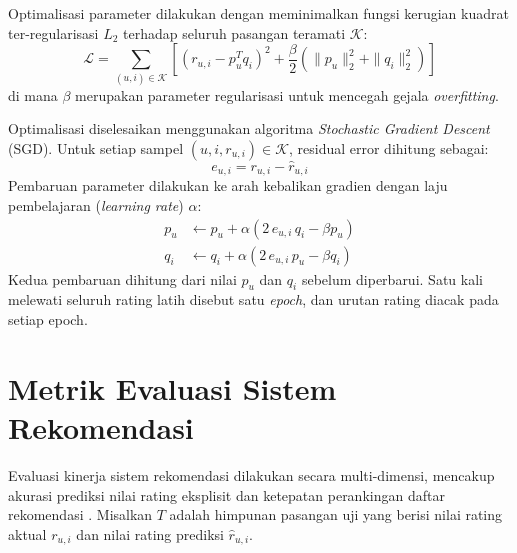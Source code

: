 Optimalisasi parameter dilakukan dengan meminimalkan fungsi kerugian kuadrat ter-regularisasi $L_2$ terhadap seluruh pasangan teramati $\mathcal{K}$:
\begin{equation}
\label{eq:mf_loss}
\mathcal{L} = \sum_{(u, i) \in \mathcal{K}} \left[ \left(r_{u,i} - p_u^T q_i\right)^2 + \frac{\beta}{2} \left(\|p_u\|_2^2 + \|q_i\|_2^2\right) \right]
\end{equation}
di mana $\beta$ merupakan parameter regularisasi untuk mencegah gejala \textit{overfitting}.

Optimalisasi diselesaikan menggunakan algoritma \textit{Stochastic Gradient Descent} (SGD). Untuk setiap sampel $(u, i, r_{u,i}) \in \mathcal{K}$, residual error dihitung sebagai:
\begin{equation}
\label{eq:mf_error}
e_{u,i} = r_{u,i} - \hat{r}_{u,i}
\end{equation}
Pembaruan parameter dilakukan ke arah kebalikan gradien dengan laju pembelajaran (\textit{learning rate}) $\alpha$:
\begin{align}
p_u &\leftarrow p_u + \alpha (2\, e_{u,i}\, q_i - \beta p_u) \label{eq:sgd_pu} \\
q_i &\leftarrow q_i + \alpha (2\, e_{u,i}\, p_u - \beta q_i) \label{eq:sgd_qi}
\end{align}
Kedua pembaruan dihitung dari nilai $p_u$ dan $q_i$ sebelum diperbarui. Satu kali melewati seluruh rating latih disebut satu \textit{epoch}, dan urutan rating diacak pada setiap epoch.

\section{Metrik Evaluasi Sistem Rekomendasi}
Evaluasi kinerja sistem rekomendasi dilakukan secara multi-dimensi, mencakup akurasi prediksi nilai rating eksplisit dan ketepatan perankingan daftar rekomendasi \citep{baizal2024recsys}. Misalkan $T$ adalah himpunan pasangan uji yang berisi nilai rating aktual $r_{u,i}$ dan nilai rating prediksi $\hat{r}_{u,i}$.


